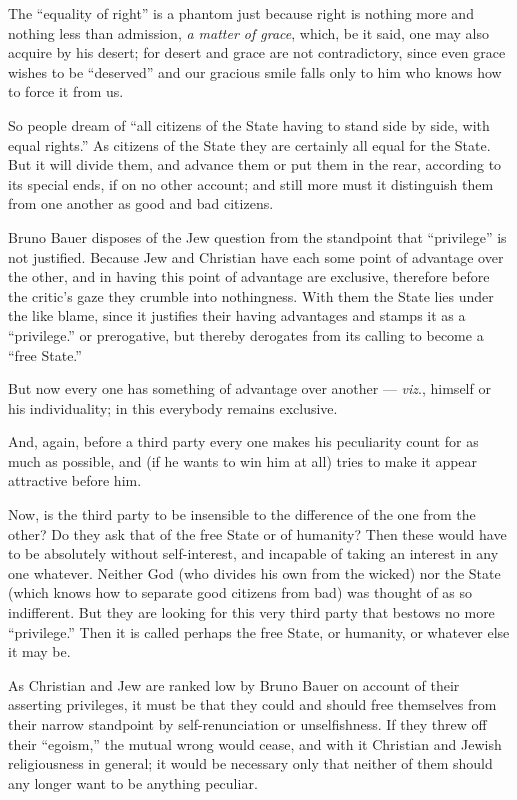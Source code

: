 The ``equality of right'' is a phantom just because right is nothing more 
and nothing less than admission, \textit{a matter of grace}, which, be it 
said, one may also acquire by his desert; for desert and grace are not 
contradictory, since even grace wishes to be ``deserved'' and our gracious 
smile falls only to him who knows how to force it from us.

So people dream of ``all citizens of the State having to stand side by side, 
with equal rights.'' As citizens of the State they are certainly all equal 
for the State. But it will divide them, and advance them or put them in the 
rear, according to its special ends, if on no other account; and still more 
must it distinguish them from one another as good and bad citizens.

Bruno Bauer disposes of the Jew question from the standpoint that 
``privilege'' is not justified. Because Jew and Christian have each some 
point of advantage over the other, and in having this point of advantage are 
exclusive, therefore before the critic's gaze they crumble into nothingness. 
With them the State lies under the like blame, since it justifies their having 
advantages and stamps it as a ``privilege.'' or prerogative, but thereby 
derogates from its calling to become a ``free State.''

But now every one has something of advantage over another --- \textit{viz}., 
himself or his individuality; in this everybody remains exclusive.

And, again, before a third party every one makes his peculiarity count for as 
much as possible, and (if he wants to win him at all) tries to make it appear 
attractive before him.

Now, is the third party to be insensible to the difference of the one from the 
other? Do they ask that of the free State or of humanity? Then these would 
have to be absolutely without self-interest, and incapable of taking an 
interest in any one whatever. Neither God (who divides his own from the 
wicked) nor the State (which knows how to separate good citizens from bad) was 
thought of as so indifferent. But they are looking for this very third party 
that bestows no more ``privilege.'' Then it is called perhaps the free 
State, or humanity, or whatever else it may be.

As Christian and Jew are ranked low by Bruno Bauer on account of their 
asserting privileges, it must be that they could and should free themselves 
from their narrow standpoint by self-renunciation or unselfishness. If they 
threw off their ``egoism,'' the mutual wrong would cease, and with it 
Christian and Jewish religiousness in general; it would be necessary only that 
neither of them should any longer want to be anything peculiar.

